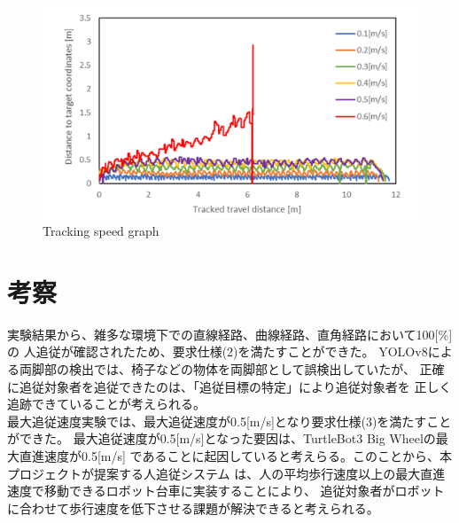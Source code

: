 \begin{figure}[h]
  \begin{center}
  \includegraphics[width=150mm,clip]{figure/Maximum-tracking-speed-experimental-result.png}
  \caption{Tracking speed graph}
  \label{Tracking speed graph}
  \end{center}
\end{figure}

\section{考察}
実験結果から、雑多な環境下での直線経路、曲線経路、直角経路において100[\%]の
人追従が確認されたため、要求仕様(2)を満たすことができた。
YOLOv8による両脚部の検出では、椅子などの物体を両脚部として誤検出していたが、
正確に追従対象者を追従できたのは、「追従目標の特定」により追従対象者を
正しく追跡できていることが考えられる。\\ \indent
最大追従速度実験では、最大追従速度が0.5[m/s]となり要求仕様(3)を満たすことができた。
最大追従速度が0.5[m/s]となった要因は、TurtleBot3 Big Wheelの最大直進速度が0.5[m/s]
であることに起因していると考えらる。このことから、本プロジェクトが提案する人追従システム
は、人の平均歩行速度以上の最大直進速度で移動できるロボット台車に実装することにより、
追従対象者がロボットに合わせて歩行速度を低下させる課題が解決できると考えられる。
